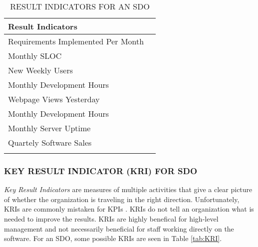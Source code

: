 \documentclass[SDSUThesis.tex]{subfiles}
\begin{document}
            \begin{longtable}{@{}l l}
                \toprule%
                 \centering%
                 {\bfseries Result Indicators} &
                 \\
                
                \cmidrule[0.4pt](r{0.125em}){1-1}%
                \endhead
                
                Requirements Implemented Per Month  \\
                \myrowcolour%
                Monthly SLOC \\
                New Weekly Users \\
                \myrowcolour%
                Monthly Development Hours \\
                Webpage Views Yesterday \\
                \myrowcolour%
                Monthly Development Hours \\
                Monthly Server Uptime \\
                \myrowcolour%
                Quartely Software Sales \\
                
                \bottomrule
                
                \caption{RESULT INDICATORS FOR AN SDO}
                \label{tab:RI}
            \end{longtable}
            
        \subsubsection{KEY RESULT INDICATOR (KRI) FOR SDO}
            \textit{Key Result Indicators} are measures of multiple
            activities that give a clear picture of whether the
            organization is traveling in the right direction.  Unfortunately,
            KRIs are commonly mistaken for KPIs \cite{parmenter2010}.  KRIs
            do not tell an organization what is needed to improve the 
            results.  KRIs are highly benefical for high-level management
            and not necessarily beneficial for staff working directly on 
            the software.  For
            an SDO, some possible KRIs are seen in Table \ref{tab:KRI}.
            
\end{document}
